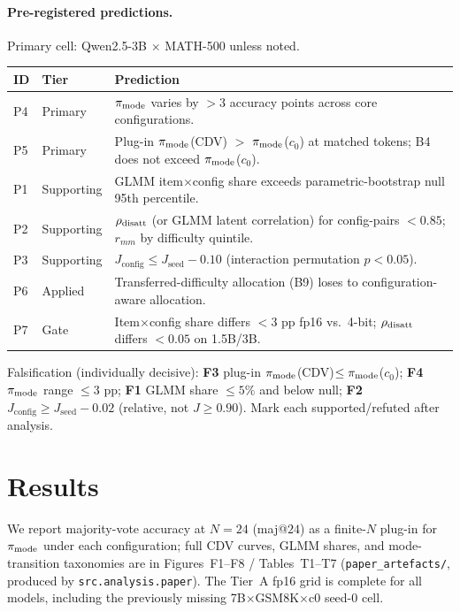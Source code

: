
\paragraph{Pre-registered predictions.}
Primary cell: Qwen2.5-3B $\times$ MATH-500 unless noted.
\begin{center}
\small
\begin{tabular}{@{}llp{7.5cm}@{}}
\toprule
ID & Tier & Prediction \\
\midrule
P4 & Primary & $\pi_{\mathrm{mode}}$ varies by ${>}3$ accuracy points across core configurations. \\
P5 & Primary & Plug-in $\pi_{\mathrm{mode}}$(CDV) $>$ $\pi_{\mathrm{mode}}$($c_0$) at matched tokens; B4 does not exceed $\pi_{\mathrm{mode}}$($c_0$). \\
P1 & Supporting & GLMM item$\times$config share exceeds parametric-bootstrap null 95th percentile. \\
P2 & Supporting & $\rho_{\mathrm{disatt}}$ (or GLMM latent correlation) for config-pairs ${<}0.85$; $r_{mm}$ by difficulty quintile. \\
P3 & Supporting & $J_{\mathrm{config}} \leq J_{\mathrm{seed}} - 0.10$ (interaction permutation $p{<}0.05$). \\
P6 & Applied & Transferred-difficulty allocation (B9) loses to configuration-aware allocation. \\
P7 & Gate & Item$\times$config share differs ${<}3$ pp fp16 vs.\ 4-bit; $\rho_{\mathrm{disatt}}$ differs ${<}0.05$ on 1.5B/3B. \\
\bottomrule
\end{tabular}
\end{center}
Falsification (individually decisive): \textbf{F3} plug-in $\pi_{\mathrm{mode}}$(CDV)$\leq\pi_{\mathrm{mode}}$($c_0$);
\textbf{F4} $\pi_{\mathrm{mode}}$ range $\leq 3$ pp; \textbf{F1} GLMM share $\leq 5\%$ and below null;
\textbf{F2} $J_{\mathrm{config}} \geq J_{\mathrm{seed}} - 0.02$ (relative, not $J\geq 0.90$).
Mark each supported/refuted after analysis.

\section{Results}
\label{sec:results}

We report majority-vote accuracy at $N{=}24$ (maj@$24$) as a finite-$N$ plug-in
for $\pi_{\mathrm{mode}}$ under each configuration; full CDV curves, GLMM shares, and
mode-transition taxonomies are in Figures~F1--F8 / Tables~T1--T7
(\texttt{paper\_artefacts/}, produced by \texttt{src.analysis.paper}).
The Tier~A fp16 grid is complete for all models, including the previously
missing 7B$\times$GSM8K$\times$c0 seed-0 cell.

